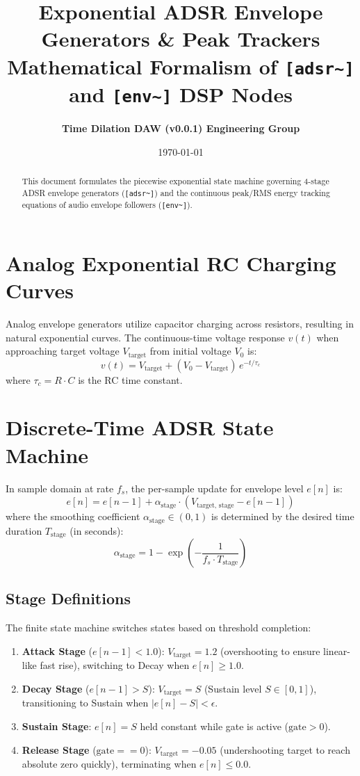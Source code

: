 \documentclass[11pt,a4paper]{article}
\title{\textbf{\Huge Exponential ADSR Envelope Generators \& Peak Trackers}\\[0.5em]
\Large Mathematical Formalism of \texttt{[adsr\textasciitilde{}]} and \texttt{[env\textasciitilde{}]} DSP Nodes}
\author{\textbf{Time Dilation DAW (v0.0.1) Engineering Group}}
\date{\today}
\begin{document}
\maketitle

\begin{abstract}
This document formulates the piecewise exponential state machine governing 4-stage ADSR envelope generators (\texttt{[adsr\textasciitilde{}]}) and the continuous peak/RMS energy tracking equations of audio envelope followers (\texttt{[env\textasciitilde{}]}).
\end{abstract}

\section{Analog Exponential RC Charging Curves}
Analog envelope generators utilize capacitor charging across resistors, resulting in natural exponential curves. The continuous-time voltage response $v(t)$ when approaching target voltage $V_{\text{target}}$ from initial voltage $V_0$ is:
\begin{equation}
v(t) = V_{\text{target}} + (V_0 - V_{\text{target}}) \, e^{-t / \tau_c}
\end{equation}
where $\tau_c = R \cdot C$ is the RC time constant.

\section{Discrete-Time ADSR State Machine}
In sample domain at rate $f_s$, the per-sample update for envelope level $e[n]$ is:
\begin{equation}
e[n] = e[n-1] + \alpha_{\text{stage}} \cdot \left( V_{\text{target, stage}} - e[n-1] \right)
\end{equation}
where the smoothing coefficient $\alpha_{\text{stage}} \in (0, 1)$ is determined by the desired time duration $T_{\text{stage}}$ (in seconds):
\begin{equation}
\alpha_{\text{stage}} = 1 - \exp\left( -\frac{1}{f_s \cdot T_{\text{stage}}} \right)
\end{equation}

\subsection{Stage Definitions}
The finite state machine switches states based on threshold completion:
\begin{enumerate}
\item \textbf{Attack Stage} ($e[n-1] < 1.0$):
$V_{\text{target}} = 1.2$ (overshooting to ensure linear-like fast rise), switching to Decay when $e[n] \ge 1.0$.
\item \textbf{Decay Stage} ($e[n-1] > S$):
$V_{\text{target}} = S$ (Sustain level $S \in [0, 1]$), transitioning to Sustain when $|e[n] - S| < \epsilon$.
\item \textbf{Sustain Stage}:
$e[n] = S$ held constant while gate is active ($\text{gate} > 0$).
\item \textbf{Release Stage} ($\text{gate} == 0$):
$V_{\text{target}} = -0.05$ (undershooting target to reach absolute zero quickly), terminating when $e[n] \le 0.0$.
\end{enumerate}
\end{document}
